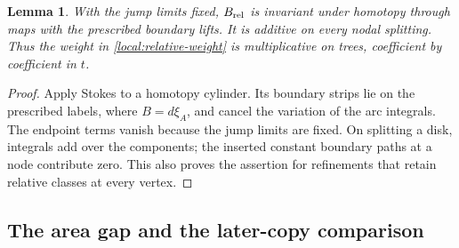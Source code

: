 \documentclass[11pt]{article}
\newtheorem{lemma}[theorem]{Lemma}
\theoremstyle{definition}
\theoremstyle{remark}
\numberwithin{equation}{section}
\begin{document}
\begin{lemma}\label{local:weight}
With the jump limits fixed, $B_{\rm rel}$ is invariant under homotopy
through maps with the prescribed boundary lifts.  It is additive on every
nodal splitting.  Thus the weight in \eqref{local:relative-weight} is
multiplicative on trees, coefficient by coefficient in $t$.
\end{lemma}
\begin{proof}
Apply Stokes to a homotopy cylinder.  Its boundary strips lie on the
prescribed labels, where $B=d\xi_A$, and cancel the variation of the arc
integrals.  The endpoint terms vanish because the jump limits are fixed.
On splitting a disk, integrals add over the components; the inserted
constant boundary paths at a node contribute zero.  This also proves the
assertion for refinements that retain relative classes at every vertex.
\end{proof}

\subsection{The area gap and the later-copy comparison}
\end{document}

